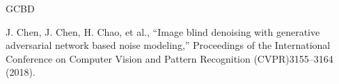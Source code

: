 GCBD

J. Chen, J. Chen, H. Chao, et al., “Image blind denoising with generative adversarial network based noise modeling,” Proceedings of the International Conference on Computer Vision and Pattern Recognition (CVPR)3155–3164 (2018).

